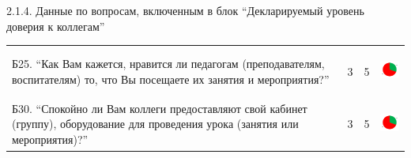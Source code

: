 \begin{frame}{2.1.4. Данные по вопросам, включенным в блок ``Декларируемый уровень доверия к коллегам'' }
\begin{tabular}{lccl}
\begin{minipage}{0.62\textwidth}
Б25. ``Как Вам кажется, нравится ли педагогам (преподавателям, воспитателям) то, что Вы посещаете их занятия и мероприятия?''
\end{minipage}
& 3 & 5 &
\begin{minipage}{1.55cm}
\includegraphics[width=1.5cm, height=1.5cm]{diag.png}
\end{minipage}
\\[0.5cm]

\begin{minipage}{0.62\textwidth}
Б30. ``Спокойно ли Вам коллеги предоставляют свой кабинет (группу), оборудование для проведения урока (занятия или мероприятия)?''
\end{minipage}
& 3 & 5 & 
\begin{minipage}{1.55cm}
\includegraphics[width=1.5cm, height=1.5cm]{diag.png}
\end{minipage}

\end{tabular}


\end{frame}


